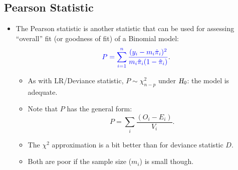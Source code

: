 \documentclass{article}\usepackage[]{graphicx}\usepackage[svgnames]{xcolor}
\newcommand{\HN}{\textsl{H}_{\textsl{0}}}%
\begin{document}
\subsection*{Pearson Statistic}
\begin{itemize}
      \item The Pearson statistic is another statistic that can be used for assessing
            ``overall'' fit (or goodness of fit) of a Binomial model:
            \[ \textcolor{Blue}{P=\sum_{i=1}^{n} \frac{(y_i-m_i\hat{\pi}_i)^2}{m_i\hat{\pi}_i(1-\hat{\pi}_i)}}. \]
            \begin{itemize}
                  \item As with LR/Deviance statistic, $ P \sim \chi^2_{n-p} $ under $ \HN $: the model is adequate.
                  \item Note that $ P $ has the general form:
                        \[ P=\sum_{i}\frac{(O_i-E_i)}{V_i}.   \]
                  \item The $ \chi^2 $ approximation is a bit better than for deviance statistic $ D $.
                  \item Both are poor if the sample size ($ m_i $) is small though.
            \end{itemize}
\end{itemize}
\end{document}

